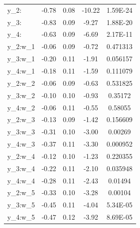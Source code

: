 \begin{table}[H]
\begin{tabular}{LCCCC}
		y_2:  & -0.78 & 0.08 & -10.22 & 1.59E-24 \\
		y_3:  & -0.83 & 0.09 & -9.27  & 1.88E-20 \\
		y_4:  & -0.63 & 0.09 & -6.69  & 2.17E-11 \\
		y_2:w_1 & -0.06 & 0.09 & -0.72  & 0.471313 \\
		y_3:w_1 & -0.20 & 0.11 & -1.91  & 0.056157 \\
		y_4:w_1 & -0.18 & 0.11 & -1.59  & 0.111079 \\
		y_2:w_2 & -0.06 & 0.09 & -0.63  & 0.531825 \\
		y_3:w_2 & -0.10 & 0.10 & -0.93  & 0.35172  \\
		y_4:w_2 & -0.06 & 0.11 & -0.55  & 0.58055  \\
		y_2:w_3 & -0.13 & 0.09 & -1.42  & 0.156609 \\
		y_3:w_3 & -0.31 & 0.10 & -3.00  & 0.00269  \\
		y_4:w_3 & -0.37 & 0.11 & -3.30  & 0.000952 \\
		y_2:w_4 & -0.12 & 0.10 & -1.23  & 0.220355 \\
		y_3:w_4 & -0.22 & 0.11 & -2.10  & 0.035948 \\
		y_4:w_4 & -0.28 & 0.11 & -2.43  & 0.01494  \\
		y_2:w_5 & -0.33 & 0.10 & -3.28  & 0.00104  \\
		y_3:w_5 & -0.45 & 0.11 & -4.04  & 5.34E-05 \\
		y_4:w_5 & -0.47 & 0.12 & -3.92  & 8.69E-05 \\
		
%		

		\bottomrule         
	\end{tabular}
\end{table}


